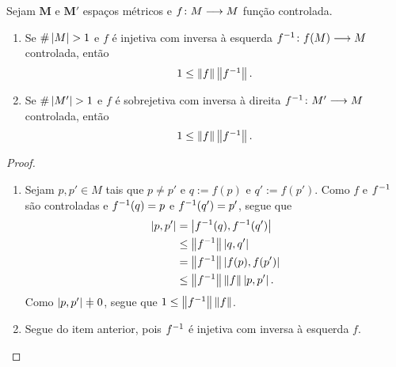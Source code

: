 \begin{proposition}
Sejam $\bm M$ e $\bm M'$ espaços métricos e ${f}\colon {M} \longrightarrow {M}$ função controlada.
	\begin{enumerate}
		\item Se $\#\left\lvert{M}\right\rvert > 1$ e $f$ é injetiva com inversa à esquerda ${f^{-1}}\colon {f(M)} \longrightarrow {M}$ controlada, então
			\begin{equation*}
\textstyle	1 \leq \left\Vert{f}\right\Vert\left\Vert{f^{-1}}\right\Vert.
			\end{equation*}
		\item Se $\#\left\lvert{M'}\right\rvert > 1$ e $f$ é sobrejetiva com inversa à direita ${f^{-1}}\colon {M'} \longrightarrow {M}$ controlada, então
			\begin{equation*}
\textstyle	1 \leq \left\Vert{f}\right\Vert\left\Vert{f^{-1}}\right\Vert.
			\end{equation*}
	\end{enumerate}
\end{proposition}
\begin{proof}
	\begin{enumerate}
	\item Sejam $p,p' \in M$ tais que $p \neq p'$ e $q := f(p)$ e $q' := f(p')$. Como $f$ e $f^{-1}$ são controladas e $f^{-1}(q) = p$ e $f^{-1}(q')=p'$, segue que
		\begin{align*}
		\left\vert{p},{p'}\right\vert &= \left\vert{f^{-1}(q)},{f^{-1}(q')}\right\vert \\
			&\leq \left\Vert{f^{-1}}\right\Vert\left\vert{q},{q'}\right\vert \\
			&= \left\Vert{f^{-1}}\right\Vert\left\vert{f(p)},{f(p')}\right\vert \\
			&\leq \left\Vert{f^{-1}}\right\Vert\left\Vert{f}\right\Vert\left\vert{p},{p'}\right\vert.
		\end{align*}
	Como $\dist{p}{p'} \neq 0$, segue que $1 \leq \left\Vert{f^{-1}}\right\Vert\left\Vert{f}\right\Vert$.
	
	\item Segue do item anterior, pois $f^{-1}$ é injetiva com inversa à esquerda $f$.
	\qedhere
	\end{enumerate}
\end{proof}

